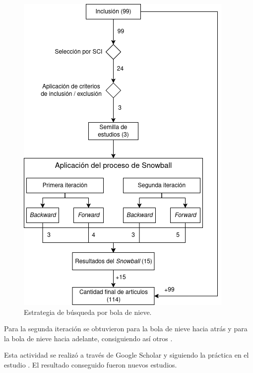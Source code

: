 \begin{figure}[htbp]
	\centering
	\includegraphics[scale=0.55]{resources/figures/sms-Snowball.drawio.png}
	\caption{Estrategia de búsqueda por bola de nieve.}
	\label{figure:Snowball}
\end{figure}

Para la segunda iteración se obtuvieron \secondBackwardSnowballStudies{} para la bola de nieve hacia atrás y \secondForwardSnowballStudies{} para la bola de nieve hacia adelante, consiguiendo así otros \secondSnowballIterationStudies{}.


Esta actividad se realizó a través de Google Scholar y siguiendo la práctica en el estudio \cite{Ali-01}. El resultado conseguido fueron \snowballNewStudies{} nuevos estudios.

